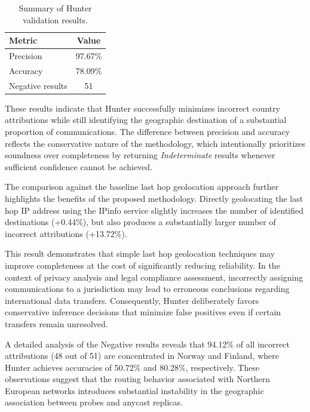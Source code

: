\begin{table}[h]
    \centering
    \caption{Summary of Hunter validation results.}
    \label{tab:hunter_validation_results}
    \begin{tabular}{lc}
        \toprule
        Metric & Value \\
        \midrule
        Precision & 97.67\% \\
        Accuracy & 78.09\% \\
        Negative results & 51 \\
        \bottomrule
    \end{tabular}
\end{table}

These results indicate that Hunter successfully minimizes incorrect country attributions while still identifying the geographic destination of a substantial proportion of communications. The difference between precision and accuracy reflects the conservative nature of the methodology, which intentionally prioritizes soundness over completeness by returning \textit{Indeterminate} results whenever sufficient confidence cannot be achieved.

The comparison against the baseline last hop geolocation approach further highlights the benefits of the proposed methodology. Directly geolocating the last hop IP address using the IPinfo service slightly increases the number of identified destinations (+0.44\%), but also produces a substantially larger number of incorrect attributions (+13.72\%).

This result demonstrates that simple last hop geolocation techniques may improve completeness at the cost of significantly reducing reliability. In the context of privacy analysis and legal compliance assessment, incorrectly assigning communications to a jurisdiction may lead to erroneous conclusions regarding international data transfers. Consequently, Hunter deliberately favors conservative inference decisions that minimize false positives even if certain transfers remain unresolved.

A detailed analysis of the Negative results reveals that 94.12\% of all incorrect attributions (48 out of 51) are concentrated in Norway and Finland, where Hunter achieves accuracies of 50.72\% and 80.28\%, respectively. These observations suggest that the routing behavior associated with Northern European networks introduces substantial instability in the geographic association between probes and anycast replicas.


